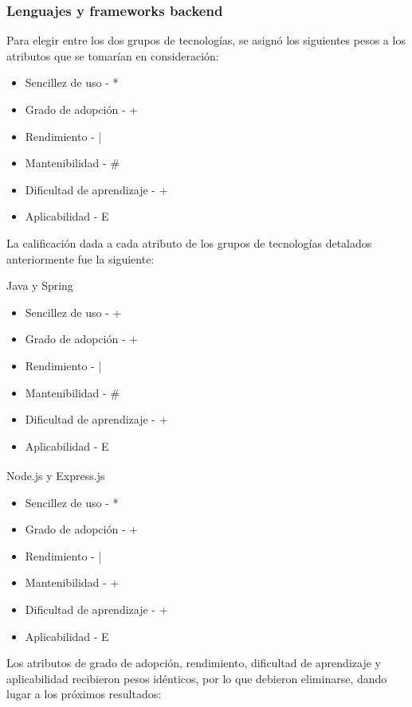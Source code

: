 \documentclass[twoside]{article}
\begin{document}
\subsubsection{Lenguajes y frameworks backend}
Para elegir entre los dos grupos de tecnologías, se asignó los siguientes pesos a los atributos que se tomarían en consideración:
\begin{itemize}
    \item Sencillez de uso - *
    \item Grado de adopción - +
    \item Rendimiento - |
    \item Mantenibilidad - \#
    \item Dificultad de aprendizaje - +
    \item Aplicabilidad - E
\end{itemize}
La calificación dada a cada atributo de los grupos de tecnologías detalados anteriormente fue la siguiente:

Java y Spring
\begin{itemize}
    \item Sencillez de uso - +
    \item Grado de adopción - +
    \item Rendimiento - |
    \item Mantenibilidad - \#
    \item Dificultad de aprendizaje - +
    \item Aplicabilidad - E
\end{itemize}
Node.js\textsuperscript{\textregistered} y Express.js
\begin{itemize}
    \item Sencillez de uso - *
    \item Grado de adopción - +
    \item Rendimiento - |
    \item Mantenibilidad - +
    \item Dificultad de aprendizaje - +
    \item Aplicabilidad - E
\end{itemize}
Los atributos de grado de adopción, rendimiento, dificultad de aprendizaje y aplicabilidad recibieron pesos idénticos, por lo que debieron eliminarse, dando lugar a los próximos resultados:
\end{document}
